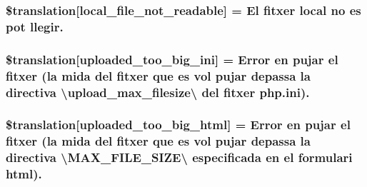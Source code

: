 \subsubsection[{\$translation}]{\setlength{\rightskip}{0pt plus 5cm}\$translation\mbox{[}\textquotesingle{}local\+\_\+file\+\_\+not\+\_\+readable\textquotesingle{}\mbox{]} = \textquotesingle{}El fitxer local no es pot llegir.\textquotesingle{}}\label{class_8upload_8ca___c_a_8php_a60104befef9b241f3a7a6a755618a4b3}
\hypertarget{class_8upload_8ca___c_a_8php_a6a08dcd0d3651fdd098568f6b2f0a42c}{}
\subsubsection[{\$translation}]{\setlength{\rightskip}{0pt plus 5cm}\$translation\mbox{[}\textquotesingle{}uploaded\+\_\+too\+\_\+big\+\_\+ini\textquotesingle{}\mbox{]} = \textquotesingle{}Error en pujar el fitxer (la mida del fitxer que es vol pujar depassa la directiva \textbackslash{}\textquotesingle{}upload\+\_\+max\+\_\+filesize\textbackslash{}\textquotesingle{} del fitxer php.\+ini).\textquotesingle{}}\label{class_8upload_8ca___c_a_8php_a6a08dcd0d3651fdd098568f6b2f0a42c}
\hypertarget{class_8upload_8ca___c_a_8php_a623d5b8b92169f57d7e43458aa911cbb}{}
\subsubsection[{\$translation}]{\setlength{\rightskip}{0pt plus 5cm}\$translation\mbox{[}\textquotesingle{}uploaded\+\_\+too\+\_\+big\+\_\+html\textquotesingle{}\mbox{]} = \textquotesingle{}Error en pujar el fitxer (la mida del fitxer que es vol pujar depassa la directiva \textbackslash{}\textquotesingle{}M\+A\+X\+\_\+\+F\+I\+L\+E\+\_\+\+S\+I\+Z\+E\textbackslash{}\textquotesingle{} especificada en el formulari html).\textquotesingle{}}\label{class_8upload_8ca___c_a_8php_a623d5b8b92169f57d7e43458aa911cbb}
\hypertarget{class_8upload_8ca___c_a_8php_a967c17da21b0a2d3bd65cca3a9ca0ea8}{}
